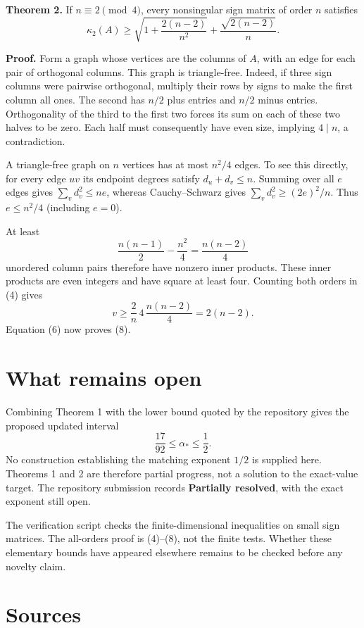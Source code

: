\documentclass[10pt,a4paper]{article}
\begin{document}
\textbf{Theorem 2.} If \(n\equiv2\pmod4\), every nonsingular sign matrix
of order \(n\) satisfies \[
 \kappa_2(A)\ge
 \sqrt{1+\frac{2(n-2)}{n^2}}+\frac{\sqrt{2(n-2)}}n.
 \tag{8}
\]

\textbf{Proof.} Form a graph whose vertices are the columns of \(A\),
with an edge for each pair of orthogonal columns. This graph is
triangle-free. Indeed, if three sign columns were pairwise orthogonal,
multiply their rows by signs to make the first column all ones. The
second has \(n/2\) plus entries and \(n/2\) minus entries. Orthogonality
of the third to the first two forces its sum on each of these two halves
to be zero. Each half must consequently have even size, implying
\(4\mid n\), a contradiction.

A triangle-free graph on \(n\) vertices has at most \(n^2/4\) edges. To
see this directly, for every edge \(uv\) its endpoint degrees satisfy
\(d_u+d_v\le n\). Summing over all \(e\) edges gives
\(\sum_vd_v^2\le ne\), whereas Cauchy--Schwarz gives
\(\sum_vd_v^2\ge(2e)^2/n\). Thus \(e\le n^2/4\) (including \(e=0\)).

At least \[
 \frac{n(n-1)}2-\frac{n^2}4=\frac{n(n-2)}4
\] unordered column pairs therefore have nonzero inner products. These
inner products are even integers and have square at least four. Counting
both orders in (4) gives \[
 v\ge\frac2n\,4\,\frac{n(n-2)}4=2(n-2).
\] Equation (6) now proves (8).

\section{What remains open}\label{what-remains-open}

Combining Theorem 1 with the lower bound quoted by the repository gives
the proposed updated interval \[
 \frac{17}{92}\le\alpha_*\le\frac12.
\] No construction establishing the matching exponent \(1/2\) is
supplied here. Theorems 1 and 2 are therefore partial progress, not a
solution to the exact-value target. The repository submission records
\textbf{Partially resolved}, with the exact exponent still open.

The verification script checks the finite-dimensional inequalities on
small sign matrices. The all-orders proof is (4)--(8), not the finite
tests. Whether these elementary bounds have appeared elsewhere remains
to be checked before any novelty claim.

\section{Sources}\label{sources}
\end{document}
